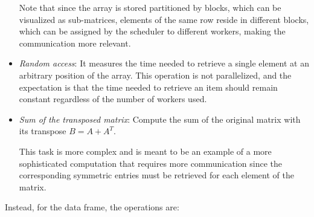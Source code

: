 \begin{itemize}
    Note that since the array is stored partitioned by blocks, which can be
    visualized as sub-matrices, elements of the same row reside in different
    blocks, which can be assigned by the scheduler to different workers, making
    the communication more relevant.
  \item \textit{Random access}: It measures the time needed to retrieve a single
    element at an arbitrary position of the array. This operation is not
    parallelized, and the expectation is that the time needed to retrieve an
    item should remain constant regardless of the number of workers used.
  \item \textit{Sum of the transposed matrix}: Compute the sum of the original
    matrix with its transpose $B = A+A^T$.

    This task is more complex and is meant to be an example of a more
    sophisticated computation that requires more communication since the
    corresponding symmetric entries must be retrieved for each element of the
    matrix.
\end{itemize}

Instead, for the data frame, the operations are:

